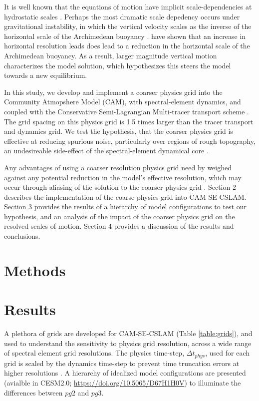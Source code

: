 \documentclass{agujournal}
\begin{document}
It is well known that the equations of motion have implicit scale-dependencies at hydrostatic scales \citep{O1981JAS}. Perhaps the most dramatic scale depedency occurs under gravitational instability, in which the vertical velocity scales as the inverse of the horizontal scale of the Archimedean buoyancy \citep{JR2016QJRMS,HR2017JCLIM,HR2018JAMES}. \cite{HR2018JAMES} have shown that an increase in horizontal resolution leads does lead to a reduction in the horizontal scale of the Archimedean buoyancy. As a result, larger magnitude vertical motion characterizes the model solution, which \cite{HR2017JCLIM} hypothesizes this steers the model towards a new equilibrium.

In this study, we develop and implement a coarser physics grid into the Community Atmopshere Model (CAM), with spectral-element dynamics, and coupled with the Conservative Semi-Lagrangian Multi-tracer transport scheme \citep[CAM-SE-CSLAM; ][]{LTOUNGK2017MWR}. The grid spacing on this physics grid is 1.5 times larger than the tracer transport and dynamics grid. We test the hypothesis, that the coarser physics grid is effective at reducing spurious noise, particularly over regions of rough topography, an undesireable side-effect of the spectral-element dynamical core \citep{HL2018MWR}. 

Any advantages of using a coarser resolution physics grid need by weighed against any potential reduction in the model's effective resolution, which may occur through aliasing of the solution to the coarser physics grid \citep{W1999T}. Section 2 describes the implementation of the coarse physics grid into CAM-SE-CSLAM. Section 3 provides the results of a hierarchy of model configurations to test our hypothesis, and an analysis of the impact of the coarser physics grid on the resolved scales of motion. Section 4 provides a discussion of the results and conclusions.

\section{Methods}



\section{Results}

A plethora of grids are developed for CAM-SE-CSLAM (Table \ref{table:grids}), and used to understand the sensitivity to physics grid resolution, across a wide range of spectral element grid resolutions. The physics time-step, $\Delta t_{phys}$, used for each grid is scaled by the dynamics time-step to prevent time truncation errors at higher resolutions \citep{HR2018JAMES}. A hierarchy of idealized model configurations are presented (avialble in CESM2.0; \url{https://doi.org/10.5065/D67H1H0V}) to illuminate the differences between $pg2$ and $pg3$.
\end{document}
